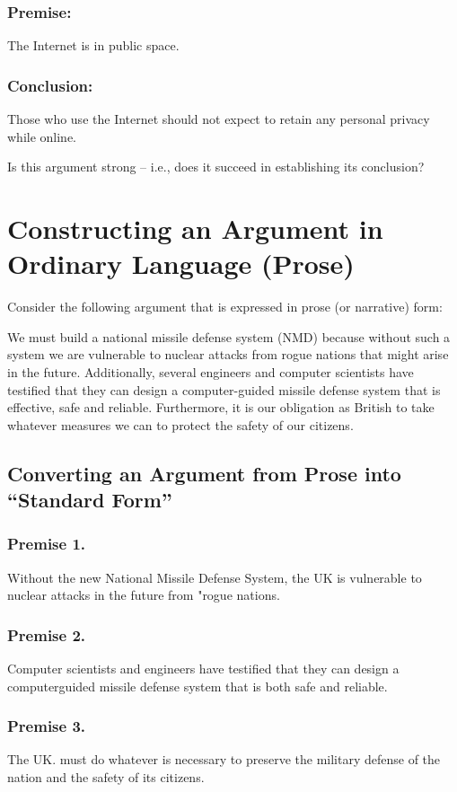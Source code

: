 \documentclass{article}
\begin{document}
\subsubsection{Premise:}
The Internet is in public space.

\subsubsection{Conclusion:}
Those who use the Internet should not expect to retain any personal privacy while online.

Is this argument strong – i.e., does it succeed in establishing its conclusion?


\section{Constructing an Argument in Ordinary Language (Prose)}

Consider the following argument that is expressed in prose (or narrative) form:

We must build a national missile defense system (NMD) because without such a system we are vulnerable to nuclear attacks from rogue nations that might arise in the future.
Additionally, several engineers and computer scientists have testified that they can design a computer-guided missile defense system that is effective, safe and reliable.
Furthermore, it is our obligation as British to take whatever measures we can to protect the safety of our citizens.

\subsection{Converting an Argument from Prose into “Standard Form”}

\subsubsection{Premise 1.}
 Without the new National Missile Defense System, the UK is vulnerable to nuclear attacks in the future from "rogue nations.

\subsubsection{Premise 2.}
 Computer scientists and engineers have testified that they can design a computerguided missile defense system that is both safe and reliable.

\subsubsection{Premise 3.}
 The UK. must do whatever is necessary to preserve the military defense of the nation and the safety of its citizens.
\end{document}
